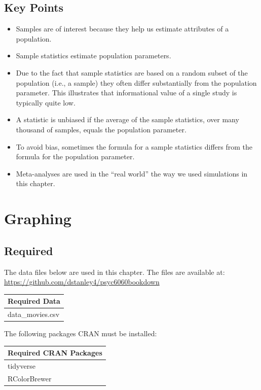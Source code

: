 \documentclass[
]{krantz}
\begin{document}
\hypertarget{key-points-1}{%
\section{Key Points}\label{key-points-1}}

\begin{itemize}
\item
  Samples are of interest because they help us estimate attributes of a population.
\item
  Sample statistics estimate population parameters.
\item
  Due to the fact that sample statistics are based on a random subset of the population (i.e., a sample) they often differ substantially from the population parameter. This illustrates that informational value of a single study is typically quite low.
\item
  A statistic is unbiased if the average of the sample statistics, over many thousand of samples, equals the population parameter.
\item
  To avoid bias, sometimes the formula for a sample statistics differs from the formula for the population parameter.
\item
  Meta-analyses are used in the ``real world'' the way we used simulations in this chapter.
\end{itemize}

\hypertarget{graphing}{%
\chapter{Graphing}\label{graphing}}

\hypertarget{required-1}{%
\section{Required}\label{required-1}}

The data files below are used in this chapter. The files are available at: \url{https://github.com/dstanley4/psyc6060bookdown}

\begin{longtable}[]{@{}l@{}}
\toprule
Required Data\tabularnewline
\midrule
\endhead
data\_movies.csv\tabularnewline
\bottomrule
\end{longtable}

The following packages CRAN must be installed:

\begin{longtable}[]{@{}l@{}}
\toprule
Required CRAN Packages\tabularnewline
\midrule
\endhead
tidyverse\tabularnewline
RColorBrewer\tabularnewline
\bottomrule
\end{longtable}
\end{document}
